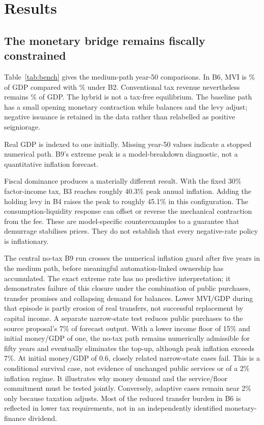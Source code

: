 \section{Results}
\subsection{The monetary bridge remains fiscally constrained}
Table~\ref{tab:bench} gives the medium-path year-50 comparisons. In B6, MVI is \ResultPSixMviGdp\% of GDP compared with \ResultPTwoMviGdp\% under B2. Conventional tax revenue nevertheless remains \ResultPSixTaxGdp\% of GDP. The hybrid is not a tax-free equilibrium. The baseline path has a small opening monetary contraction while balances and the levy adjust; negative issuance is retained in the data rather than relabelled as positive seigniorage.

\begin{table}[htbp]\centering\small
\caption{Medium automation at year 50; peak inflation covers the entire available path}\label{tab:bench}

\par\smallskip\footnotesize Real GDP is indexed to one initially. Missing year-50 values indicate a stopped numerical path. B9's extreme peak is a model-breakdown diagnostic, not a quantitative inflation forecast.
\end{table}

Fiscal dominance produces a materially different result. With the fixed 30\% factor-income tax, B3 reaches roughly 40.3\% peak annual inflation. Adding the holding levy in B4 raises the peak to roughly 45.1\% in this configuration. The consumption-liquidity response can offset or reverse the mechanical contraction from the fee. These are model-specific counterexamples to a guarantee that demurrage stabilises prices. They do not establish that every negative-rate policy is inflationary.

The central no-tax B9 run crosses the numerical inflation guard after five years in the medium path, before meaningful automation-linked ownership has accumulated. The exact extreme rate has no predictive interpretation; it demonstrates failure of this closure under the combination of public purchases, transfer promises and collapsing demand for balances. Lower MVI/GDP during that episode is partly erosion of real transfers, not successful replacement by capital income. A separate narrow-state test reduces public purchases to the source proposal's 7\% of forecast output. With a lower income floor of 15\% and initial money/GDP of one, the no-tax path remains numerically admissible for fifty years and eventually eliminates the top-up, although peak inflation exceeds 7\%. At initial money/GDP of 0.6, closely related narrow-state cases fail. This is a conditional survival case, not evidence of unchanged public services or of a 2\% inflation regime. It illustrates why money demand and the service/floor commitment must be tested jointly. Conversely, adaptive cases remain near 2\% only because taxation adjusts. Most of the reduced transfer burden in B6 is reflected in lower tax requirements, not in an independently identified monetary-finance dividend.

